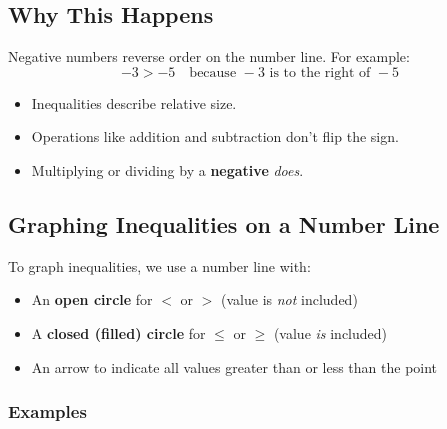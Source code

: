 \documentclass[11pt]{article}
\begin{document}
\subsection*{Why This Happens}

Negative numbers reverse order on the number line. For example:
\[
-3 > -5 \quad \text{because } -3 \text{ is to the right of } -5
\]

\begin{tcolorbox}[colback=yellow!5!white, colframe=yellow!80!black, title=Summary]
\begin{itemize}
  \item Inequalities describe relative size.
  \item Operations like addition and subtraction don’t flip the sign.
  \item Multiplying or dividing by a \textbf{negative} \emph{does}.
\end{itemize}
\end{tcolorbox}

\subsection{Graphing Inequalities on a Number Line}

To graph inequalities, we use a number line with:
\begin{itemize}
  \item An \textbf{open circle} for \( < \) or \( > \) (value is \emph{not} included)
  \item A \textbf{closed (filled) circle} for \( \leq \) or \( \geq \) (value \emph{is} included)
  \item An arrow to indicate all values greater than or less than the point
\end{itemize}

\subsubsection*{Examples}

\begin{center}
\end{center}
\end{document}

